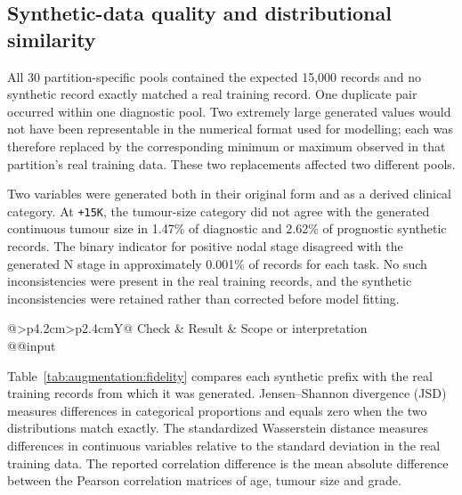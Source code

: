 \subsection{Synthetic-data quality and distributional similarity}
\label{sec:augmentation:fidelity}

All 30 partition-specific pools contained the expected 15,000 records and no
synthetic record exactly matched a real training record.  One duplicate pair
occurred within one diagnostic pool.  Two extremely large generated values
would not have been representable in the numerical format used for modelling;
each was therefore replaced by the corresponding minimum or maximum observed
in that partition's real training data.  These two replacements affected two
different pools.

Two variables were generated both in their original form and as a derived
clinical category.  At \texttt{+15K}, the tumour-size category did not agree
with the generated continuous tumour size in 1.47\% of diagnostic and 2.62\%
of prognostic synthetic records.  The binary indicator for positive nodal
stage disagreed with the generated N stage in approximately 0.001\% of records
for each task.  No such inconsistencies were present in the real training
records, and the synthetic inconsistencies were retained rather than corrected
before model fitting.

\begin{table}[htbp]
\centering\footnotesize
\caption{Quality checks for the 30 partition-specific synthetic pools.}
\label{tab:augmentation:integrity}
\begin{tabularx}{\linewidth}{@{}>{\RaggedRight\arraybackslash}p{4.2cm}>{\RaggedRight\arraybackslash}p{2.4cm}Y@{}}
\toprule
Check & Result & Scope or interpretation \\
\midrule
\csname @@input
\bottomrule
\end{tabularx}
\end{table}

Table~\ref{tab:augmentation:fidelity} compares each synthetic prefix with the
real training records from which it was generated.  Jensen--Shannon divergence
(JSD) measures differences in categorical proportions and equals zero when the
two distributions match exactly.  The standardized Wasserstein distance
measures differences in continuous variables relative to the standard
deviation in the real training data.  The reported correlation difference is
the mean absolute difference between the Pearson correlation matrices of age,
tumour size and grade.

